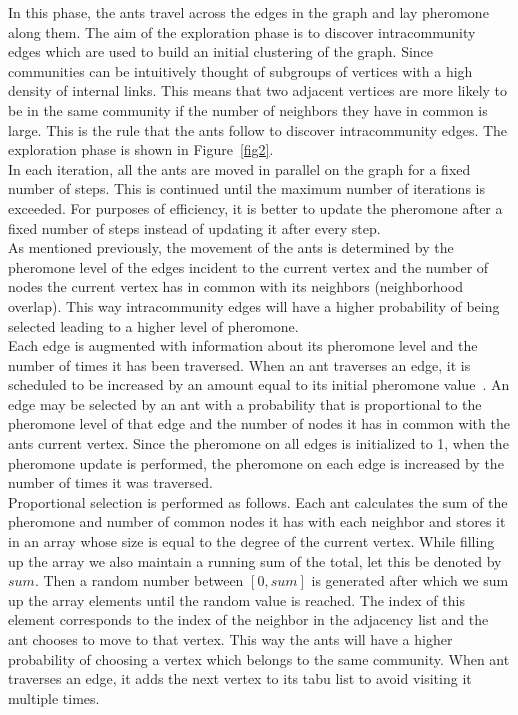 \begin{spacing}{1.5}
In this phase, the ants travel across the edges in the graph and lay pheromone along them. The aim of the exploration phase is to discover intracommunity edges which are used to build an initial clustering of the graph. Since communities can be intuitively thought of subgroups of vertices with a high density of internal links. This means that two adjacent vertices are more likely to be in the same community if the number of neighbors they have in common is large. This is the rule that the ants follow to discover intracommunity edges. The exploration phase is shown in Figure~\ref{fig2}.\\

\indent In each iteration, all the ants are moved in parallel on the graph for a fixed number of steps. This is continued until the maximum number of iterations is exceeded. For purposes of efficiency, it is better to update the pheromone after a fixed number of steps instead of updating it after every step.\\
\indent As mentioned previously, the movement of the ants is determined by the pheromone level of the edges incident to the current vertex and the number of nodes the current vertex has in common with its neighbors (neighborhood overlap). This way intracommunity edges will have a higher probability of being selected leading to a higher level of pheromone. \\
\indent Each edge is augmented with information about its pheromone level and the number of times it has been traversed. When an ant traverses an edge, it is scheduled to be increased by an amount equal to its initial pheromone value~\cite{5910378}. An edge may be selected by an ant with a probability that is proportional to the pheromone level of that edge and the number of nodes it has in common with the ants current vertex. Since the pheromone on all edges is initialized to 1, when the pheromone update is performed, the pheromone on each edge is increased by the number of times it was traversed.\\
\indent Proportional selection is performed as follows. Each ant calculates the sum of the pheromone and number of common nodes it has with each neighbor and stores it in an array whose size is equal to the degree of the current vertex. While filling up the array we also maintain a running sum of the total, let this be denoted by $sum$. Then a random number between $[0, sum]$ is generated after which we sum up the array elements until the random value is reached. The index of this element corresponds to the index of the neighbor in the adjacency list and the ant chooses to move to that vertex. This way the ants will have a higher probability of choosing a vertex which belongs to the same community. When ant traverses an edge, it adds the next vertex to its tabu list to avoid visiting it multiple times.\\

\end{spacing}
